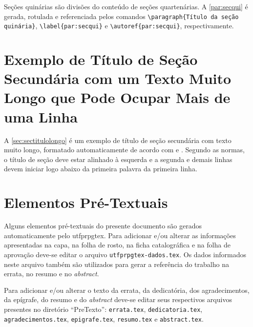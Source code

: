 Seções quinárias são divisões do conteúdo de seções quartenárias. A \autoref{par:secqui} é gerada, rotulada e referenciada pelos comandos \verb|\paragraph{Título da seção quinária}|, \verb|\label{par:secqui}| e \verb|\autoref{par:secqui}|, respectivamente.

\section{Exemplo de Título de Seção Secundária com um Texto Muito Longo que Pode Ocupar Mais de uma Linha}\label{sec:sectitulolongo}

A \autoref{sec:sectitulolongo} é um exemplo de título de seção secundária com texto muito longo, formatado automaticamente de acordo com  e . Segundo as normas, o título de seção deve estar alinhado à esquerda e a segunda e demais linhas devem iniciar logo abaixo da primeira palavra da primeira linha.

\section{Elementos Pré-Textuais}\label{sec:elempretext}

Alguns elementos pré-textuais do presente documento são gerados automaticamente pelo \gls{utfprpgtex}. Para adicionar e/ou alterar as informações apresentadas na capa, na folha de rosto, na ficha catalográfica e na folha de aprovação deve-se editar o arquivo \texttt{utfprpgtex-dados.tex}. Os dados informados neste arquivo também são utilizados para gerar a referência do trabalho na errata, no resumo e no \textit{abstract}.

Para adicionar e/ou alterar o texto da errata, da dedicatória, dos agradecimentos, da epígrafe, do resumo e do \textit{abstract} deve-se editar seus respectivos arquivos presentes no diretório ``PreTexto'': \texttt{errata.tex}, \texttt{dedicatoria.tex}, \texttt{agradecimentos.tex}, \texttt{epigrafe.tex}, \texttt{resumo.tex} e \texttt{abstract.tex}.

